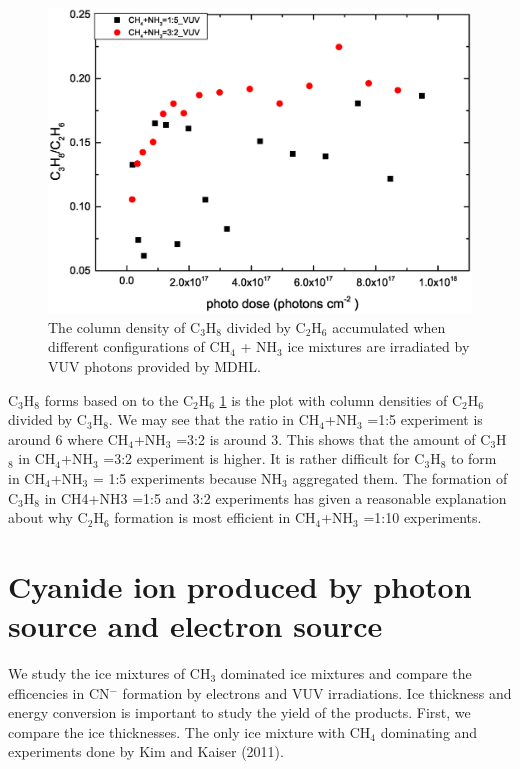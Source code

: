 \begin{figure}
\centering
\includegraphics[width=\textwidth]{figures/chapter3/Lab_C3H8_C2H6.eps}
\caption{The column density of C$_3$H$_8$ divided by C$_2$H$_6$ accumulated when different configurations of CH$_4$ + NH$_3$ ice mixtures are irradiated by VUV photons provided by MDHL.}
\label{fig:C2H6_C3H8}
\end{figure}

C$_3$H$_8$ forms based on to the C$_2$H$_6$ \ref{fig:C2H6_C3H8} is the plot with column densities of C$_2$H$_6$ divided by C$_3$H$_8$. We may see that the ratio in CH$_4$+NH$_3$ =1:5 experiment is around 6 where CH$_4$+NH$_3$ =3:2 is around 3. This shows that the amount of C$_3$H$_8$ in CH$_4$+NH$_3$ =3:2 experiment is higher. It is rather difficult for C$_3$H$_8$ to form in CH$_4$+NH$_3$ = 1:5 experiments because NH$_3$ aggregated them. The formation of C$_3$H$_8$ in CH4+NH3 =1:5 and 3:2 experiments has given a reasonable explanation about why C$_2$H$_6$ formation is most efficient in CH$_4$+NH$_3$ =1:10 experiments.

\section{Cyanide ion produced by photon source and electron source} %

We study the ice mixtures of CH$_3$ dominated ice mixtures and compare the efficencies in CN$^-$ formation by electrons and VUV irradiations.  Ice thickness and energy conversion is important to study the yield of the products. First, we compare the ice thicknesses. The only ice mixture with CH$_4$ dominating  and experiments done by Kim and Kaiser (2011)\cite{kim}.

